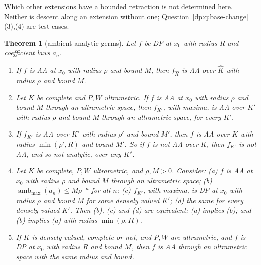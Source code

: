 \documentclass[11pt]{amsart}
\newtheorem{theorem}{Theorem}[section]
\theoremstyle{definition}
\theoremstyle{remark}
\numberwithin{equation}{section}
\newcommand{\Kh}{\widehat K}
\theoremstyle{plain}
\theoremstyle{definition}
\theoremstyle{plain}
\begin{document}
Which other extensions have a bounded retraction is not determined here. Neither is descent along an extension without one; Question~\ref{dp:q:base-change}(3),(4) are test cases.

\begin{theorem}[ambient analytic germs]\label{dp:thm:aa-base-change}
Let $f$ be DP at $x_0$ with radius $R$ and coefficient laws $a_n$.
\begin{enumerate}
\item If $f$ is AA at $x_0$ with radius $\rho$ and bound $M$, then $f_{\Kh}$ is AA over $\Kh$ with radius $\rho$ and bound $M$.
\item Let $K$ be complete and $P,W$ ultrametric. If $f$ is AA at $x_0$ with radius $\rho$ and bound $M$ through an ultrametric space, then $f_{K'}$, with maxima, is AA over $K'$ with radius $\rho$ and bound $M$ through an ultrametric space, for every $K'$.
\item If $f_{K'}$ is AA over $K'$ with radius $\rho'$ and bound $M'$, then $f$ is AA over $K$ with radius $\min(\rho',R)$ and bound $M'$. So if $f$ is not AA over $K$, then $f_{K'}$ is not AA, and so not analytic, over any $K'$.
\item Let $K$ be complete, $P,W$ ultrametric, and $\rho,M>0$. Consider: \textup{(a)} $f$ is AA at $x_0$ with radius $\rho$ and bound $M$ through an ultrametric space; \textup{(b)} $\operatorname{amb}_{\max}(a_n)\le M\rho^{-n}$ for all $n$; \textup{(c)} $f_{K'}$, with maxima, is DP at $x_0$ with radius $\rho$ and bound $M$ for some densely valued $K'$; \textup{(d)} the same for every densely valued $K'$. Then \textup{(b)}, \textup{(c)} and \textup{(d)} are equivalent; \textup{(a)} implies \textup{(b)}; and \textup{(b)} implies \textup{(a)} with radius $\min(\rho,R)$.
\item If $K$ is densely valued, complete or not, and $P,W$ are ultrametric, and $f$ is DP at $x_0$ with radius $R$ and bound $M$, then $f$ is AA through an ultrametric space with the same radius and bound.
\end{enumerate}
\end{theorem}
\end{document}
